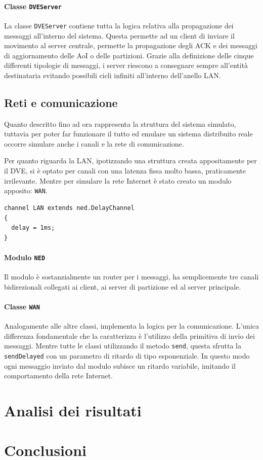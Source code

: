 \documentclass[a4paper, 11pt, oneside]{book}
\theoremstyle{definition}
\theoremstyle{remark}
\begin{document}
\subsubsection{Classe \texttt{DVEServer}}
La classe \texttt{DVEServer} contiene tutta la logica relativa alla propagazione
dei messaggi all'interno del sistema. Questa permette ad un client di inviare
il movimento al server centrale, permette la propagazione degli ACK e dei
messaggi di aggiornamento delle AoI o delle partizioni.
Grazie alla definizione delle cinque differenti tipologie di messaggi, i server
riescono a consegnare sempre all'entità destinataria evitando
possibili cicli infiniti all'interno dell'anello LAN.

\section{Reti e comunicazione}
Quanto descritto fino ad ora rappresenta la struttura del sistema simulato,
tuttavia per poter far funzionare il tutto ed emulare un sistema distribuito
reale occorre simulare anche i canali e la rete di comunicazione.

Per quanto riguarda la LAN, ipotizzando una struttura creata appositamente
per il DVE, si è optato per canali con una latenza fissa molto bassa,
praticamente irrilevante. Mentre per simulare la rete Internet è stato creato
un modulo apposito: \texttt{WAN}.
\begin{lstlisting}
channel LAN extends ned.DelayChannel
{
  delay = 1ms;
}
\end{lstlisting}

\subsubsection{Modulo \texttt{NED}}
Il modulo è sostanzialmente un router per i messaggi, ha semplicemente tre
canali bidirezionali collegati ai client, ai server di partizione ed al server
principale.
\subsubsection{Classe \texttt{WAN}}
Analogamente alle altre classi, implementa la logica per la comunicazione.
L'unica differenza fondamentale che la caratterizza è l'utilizzo della
primitiva di invio dei messaggi. Mentre tutte le classi utilizzando il metodo
\texttt{send}, questa sfrutta la \texttt{sendDelayed} con un parametro
di ritardo di tipo esponenziale. In questo modo ogni messaggio inviato dal
modulo subisce un ritardo variabile, imitando il comportamento della rete
Internet.

\chapter{Analisi dei risultati}\label{analisi}


\chapter{Conclusioni}\label{conclusioni}



\end{document}
